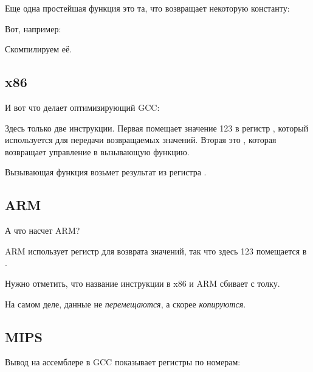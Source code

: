 \label{ret_val_func}

Еще одна простейшая функция это та, что возвращает некоторую константу:

Вот, например:



Скомпилируем её.

\subsection{x86}

И вот что делает оптимизирующий GCC:



Здесь только две инструкции. Первая помещает значение 123 в регистр \EAX, который используется
для передачи возвращаемых значений. Вторая это \RET, которая возвращает управление в вызывающую функцию.

Вызывающая функция возьмет результат из регистра \EAX.

\subsection{ARM}

А что насчет ARM?



ARM использует регистр  для возврата значений, так что здесь 123 помещается в .

Нужно отметить, что название инструкции \MOV в x86 и ARM сбивает с толку.

На самом деле, данные не \emph{перемещаются}, а скорее \emph{копируются}.

\subsection{MIPS}

\label{MIPS_leaf_function_ex1}
Вывод на ассемблере в GCC показывает регистры по номерам:



